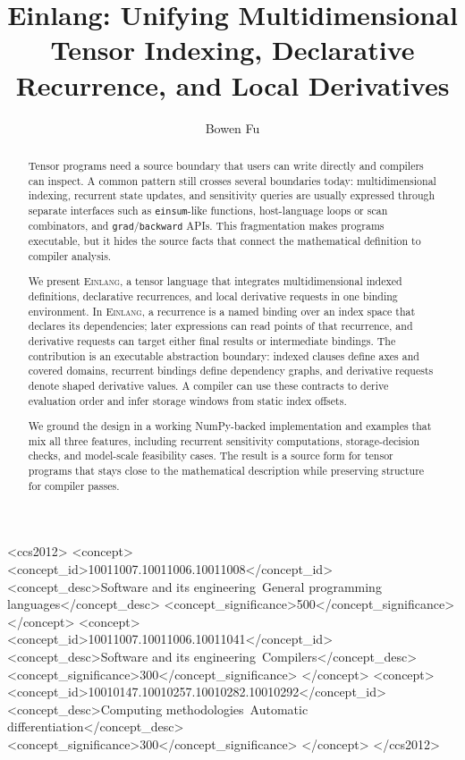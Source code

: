 \documentclass[sigplan,screen,nonacm]{acmart}
\title[Einlang]{Einlang: Unifying Multidimensional Tensor Indexing, Declarative Recurrence, and Local Derivatives}
\author{Bowen Fu}
\newcommand{\einlang}{\textsc{Einlang}}
\begin{document}
\begin{abstract}
Tensor programs need a source boundary that users can write directly and compilers can inspect. A common pattern still crosses several boundaries today: multidimensional indexing, recurrent state updates, and sensitivity queries are usually expressed through separate interfaces such as \texttt{einsum}-like functions, host-language loops or scan combinators, and \texttt{grad}/\texttt{backward} APIs. This fragmentation makes programs executable, but it hides the source facts that connect the mathematical definition to compiler analysis.

We present \einlang{}, a tensor language that integrates multidimensional indexed definitions, declarative recurrences, and local derivative requests in one binding environment. In \einlang{}, a recurrence is a named binding over an index space that declares its dependencies; later expressions can read points of that recurrence, and derivative requests can target either final results or intermediate bindings. The contribution is an executable abstraction boundary: indexed clauses define axes and covered domains, recurrent bindings define dependency graphs, and derivative requests denote shaped derivative values. A compiler can use these contracts to derive evaluation order and infer storage windows from static index offsets.

We ground the design in a working NumPy-backed implementation and examples that mix all three features, including recurrent sensitivity computations, storage-decision checks, and model-scale feasibility cases. The result is a source form for tensor programs that stays close to the mathematical description while preserving structure for compiler passes.
\end{abstract}

\begin{CCSXML}
<ccs2012>
<concept>
<concept_id>10011007.10011006.10011008</concept_id>
<concept_desc>Software and its engineering~General programming languages</concept_desc>
<concept_significance>500</concept_significance>
</concept>
<concept>
<concept_id>10011007.10011006.10011041</concept_id>
<concept_desc>Software and its engineering~Compilers</concept_desc>
<concept_significance>300</concept_significance>
</concept>
<concept>
<concept_id>10010147.10010257.10010282.10010292</concept_id>
<concept_desc>Computing methodologies~Automatic differentiation</concept_desc>
<concept_significance>300</concept_significance>
</concept>
</ccs2012>
\end{CCSXML}
\end{document}
